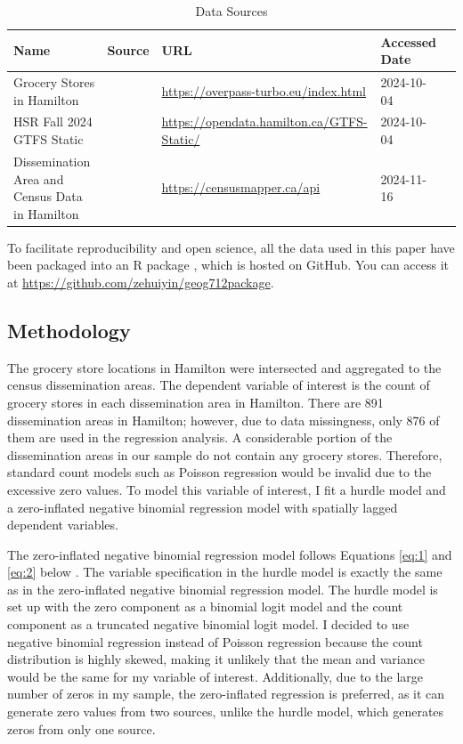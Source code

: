 \documentclass[preprint, 3p,
authoryear]{elsarticle} %
\begin{document}
\begin{table}[h]
\centering
\begin{footnotesize}
\begin{tabularx}{\textwidth}{XllXl}
\hline
Name                                           & Source              & URL                                             & Accessed Date \\
\hline
Grocery Stores in Hamilton                     & \cite{osm}          & \url{https://overpass-turbo.eu/index.html}      & 2024-10-04    \\
HSR Fall 2024 GTFS Static                      & \cite{hsr_gtfs}     & \url{https://opendata.hamilton.ca/GTFS-Static/} & 2024-10-04    \\
Dissemination Area and Census Data in Hamilton & \cite{census}       & \url{https://censusmapper.ca/api}               & 2024-11-16    \\
\hline
\end{tabularx}
\caption{\label{tab:data_source}Data Sources}
\end{footnotesize}
\end{table}

To facilitate reproducibility and open science, all the data used in
this paper have been packaged into an R package \citep{geog712package},
which is hosted on GitHub. You can access it at
\url{https://github.com/zehuiyin/geog712package}.

\subsection{Methodology}\label{methodology}

The grocery store locations in Hamilton were intersected and aggregated
to the census dissemination areas. The dependent variable of interest is
the count of grocery stores in each dissemination area in Hamilton.
There are 891 dissemination areas in Hamilton; however, due to data
missingness, only 876 of them are used in the regression analysis. A
considerable portion of the dissemination areas in our sample do not
contain any grocery stores. Therefore, standard count models such as
Poisson regression would be invalid due to the excessive zero values. To
model this variable of interest, I fit a hurdle model and a
zero-inflated negative binomial regression model with spatially lagged
dependent variables.

The zero-inflated negative binomial regression model follows Equations
\ref{eq:1} and \ref{eq:2} below \citep{zinb}. The variable specification
in the hurdle model is exactly the same as in the zero-inflated negative
binomial regression model. The hurdle model is set up with the zero
component as a binomial logit model and the count component as a
truncated negative binomial logit model. I decided to use negative
binomial regression instead of Poisson regression because the count
distribution is highly skewed, making it unlikely that the mean and
variance would be the same for my variable of interest. Additionally,
due to the large number of zeros in my sample, the zero-inflated
regression is preferred, as it can generate zero values from two
sources, unlike the hurdle model, which generates zeros from only one
source.
\end{document}
